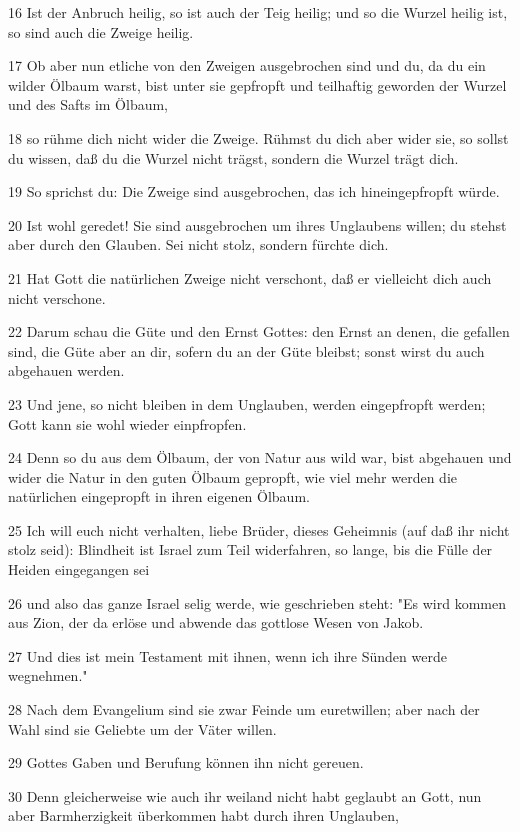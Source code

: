 \par 16 Ist der Anbruch heilig, so ist auch der Teig heilig; und so die Wurzel heilig ist, so sind auch die Zweige heilig.
\par 17 Ob aber nun etliche von den Zweigen ausgebrochen sind und du, da du ein wilder Ölbaum warst, bist unter sie gepfropft und teilhaftig geworden der Wurzel und des Safts im Ölbaum,
\par 18 so rühme dich nicht wider die Zweige. Rühmst du dich aber wider sie, so sollst du wissen, daß du die Wurzel nicht trägst, sondern die Wurzel trägt dich.
\par 19 So sprichst du: Die Zweige sind ausgebrochen, das ich hineingepfropft würde.
\par 20 Ist wohl geredet! Sie sind ausgebrochen um ihres Unglaubens willen; du stehst aber durch den Glauben. Sei nicht stolz, sondern fürchte dich.
\par 21 Hat Gott die natürlichen Zweige nicht verschont, daß er vielleicht dich auch nicht verschone.
\par 22 Darum schau die Güte und den Ernst Gottes: den Ernst an denen, die gefallen sind, die Güte aber an dir, sofern du an der Güte bleibst; sonst wirst du auch abgehauen werden.
\par 23 Und jene, so nicht bleiben in dem Unglauben, werden eingepfropft werden; Gott kann sie wohl wieder einpfropfen.
\par 24 Denn so du aus dem Ölbaum, der von Natur aus wild war, bist abgehauen und wider die Natur in den guten Ölbaum gepropft, wie viel mehr werden die natürlichen eingepropft in ihren eigenen Ölbaum.
\par 25 Ich will euch nicht verhalten, liebe Brüder, dieses Geheimnis (auf daß ihr nicht stolz seid): Blindheit ist Israel zum Teil widerfahren, so lange, bis die Fülle der Heiden eingegangen sei
\par 26 und also das ganze Israel selig werde, wie geschrieben steht: "Es wird kommen aus Zion, der da erlöse und abwende das gottlose Wesen von Jakob.
\par 27 Und dies ist mein Testament mit ihnen, wenn ich ihre Sünden werde wegnehmen."
\par 28 Nach dem Evangelium sind sie zwar Feinde um euretwillen; aber nach der Wahl sind sie Geliebte um der Väter willen.
\par 29 Gottes Gaben und Berufung können ihn nicht gereuen.
\par 30 Denn gleicherweise wie auch ihr weiland nicht habt geglaubt an Gott, nun aber Barmherzigkeit überkommen habt durch ihren Unglauben,
